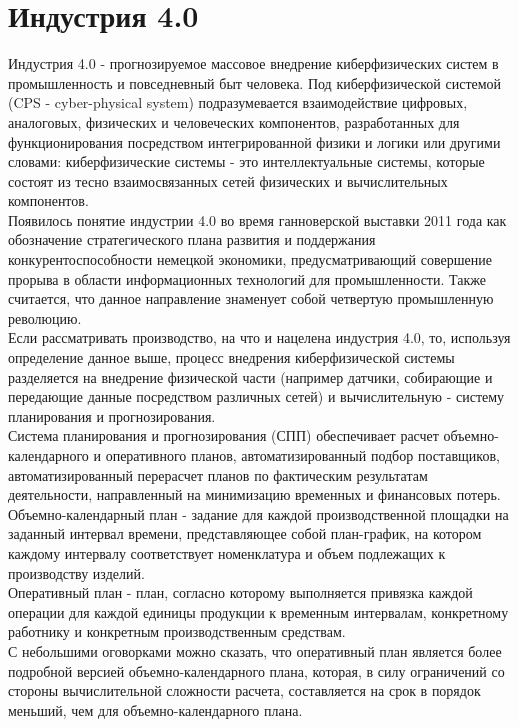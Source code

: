 \section{Индустрия 4.0}
Индустрия 4.0 - прогнозируемое массовое внедрение киберфизических систем в промышленность и повседневный быт человека.
Под киберфизической системой (CPS - cyber-physical system) подразумевается взаимодействие цифровых, аналоговых, физических и человеческих компонентов, разработанных для функционирования посредством интегрированной физики и логики или другими словами: киберфизические системы - это интеллектуальные системы, которые состоят из тесно взаимосвязанных сетей физических и вычислительных компонентов.\cite{nist}\\
\indent Появилось понятие индустрии 4.0 во время ганноверской выставки 2011 года как обозначение стратегического плана развития и поддержания конкурентоспособности немецкой экономики, предусматривающий совершение прорыва в области информационных технологий для промышленности.
Также считается, что данное направление знаменует собой четвертую промышленную революцию.\cite{industry}\\
\indent Если рассматривать производство, на что и нацелена индустрия 4.0, то, используя определение данное выше, процесс внедрения киберфизической системы разделяется на внедрение физической части (например датчики, собирающие и передающие данные посредством различных сетей) и вычислительную - систему планирования и прогнозирования.\\
\indent Система планирования и прогнозирования (СПП) обеспечивает расчет объемно-календарного и оперативного планов, автоматизированный подбор поставщиков, автоматизированный перерасчет планов по фактическим результатам деятельности, направленный на минимизацию временных и финансовых потерь.\\
\indent Объемно-календарный план - задание для каждой производственной площадки на заданный интервал времени, представляющее собой план-график, на котором каждому интервалу соответствует номенклатура и объем подлежащих к производству изделий.\cite{niokr}\\
\indent Оперативный план - план, согласно которому выполняется привязка каждой операции для каждой единицы продукции к временным интервалам, конкретному работнику и конкретным производственным средствам.\cite{niokr}\\
\indent С небольшими оговорками можно сказать, что оперативный план является более подробной версией объемно-календарного плана, которая, в силу ограничений со стороны вычислительной сложности расчета, составляется на срок в порядок меньший, чем для объемно-календарного плана.
